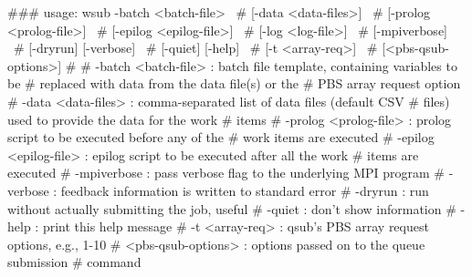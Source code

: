 \begin{prompt}
### usage: wsub  -batch <batch-file>          \
#                [-data <data-files>]         \
#                [-prolog <prolog-file>]      \
#                [-epilog <epilog-file>]      \
#                [-log <log-file>]            \
#                [-mpiverbose]                \
#                [-dryrun] [-verbose]         \
#                [-quiet] [-help]             \
#                [-t <array-req>]             \
#                [<pbs-qsub-options>]
#
#   -batch <batch-file>   : batch file template, containing variables to be
#                           replaced with data from the data file(s) or the
#                           PBS array request option
#   -data <data-files>    : comma-separated list of data files (default CSV
#                           files) used to provide the data for the work
#                           items
#   -prolog <prolog-file> : prolog script to be executed before any of the
#                           work items are executed
#   -epilog <epilog-file> : epilog script to be executed after all the work
#                           items are executed
#   -mpiverbose           : pass verbose flag to the underlying MPI program
#   -verbose              : feedback information is written to standard error
#   -dryrun               : run without actually submitting the job, useful
#   -quiet                : don't show information
#   -help                 : print this help message
#   -t <array-req>        : qsub's PBS array request options, e.g., 1-10
#   <pbs-qsub-options>    : options passed on to the queue submission
#                           command
\end{prompt}
